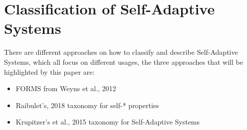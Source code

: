 \newpage
\section{Classification of Self-Adaptive Systems}
\label{ch:SASClassification}





There are different approaches on how to classify and describe Self-Adaptive Systems,
which all focus on different usages, the three approaches that will be highlighted by this paper are:
\begin{itemize}
    \item FORMS from Weyns et al., 2012 \cite*{FORMS}
    \item Raibulet's, 2018 taxonomy for self-* properties \cite*{TaxonomyOfSelfSoftware}
    \item Krupitzer's et al., 2015 taxonomy for Self-Adaptive Systems \cite*{SurveyOnEngineeringApproaches}
\end{itemize} 


